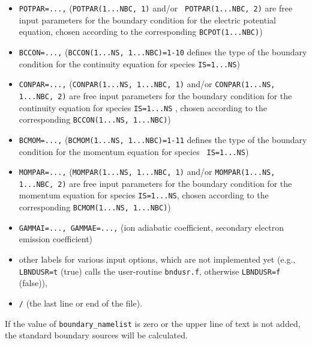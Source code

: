 \documentclass[11pt]{article}
\begin{document}
\begin{itemize}
\item  \texttt{POTPAR=...,} (\texttt{POTPAR(1...NBC, 1)} and/or \texttt{%
POTPAR(1...NBC, 2)} are free input parameters for the boundary condition for
the electric potential equation, chosen according to the corresponding 
\texttt{BCPOT(1...NBC)})

\item  \texttt{BCCON=...,} (\texttt{BCCON(1...NS, 1...NBC)=1-10} defines the
type of the boundary condition for the continuity equation for species 
\texttt{IS=1...NS})

\item  \texttt{CONPAR=...,} (\texttt{CONPAR(1...NS, 1...NBC, 1)} and/or 
\texttt{CONPAR(1...NS, 1...NBC, 2)} are free input parameters for the
boundary condition for the continuity equation for species \texttt{IS=1...NS}%
, chosen according to the corresponding \texttt{BCCON(1...NS, 1...NBC)})

\item  \texttt{BCMOM=...,} (\texttt{BCMOM(1...NS, 1...NBC)=1-11} defines the
type of the boundary condition for the momentum equation for species \texttt{%
IS=1...NS})

\item  \texttt{MOMPAR=...,} (\texttt{MOMPAR(1...NS, 1...NBC, 1)} and/or 
\texttt{MOMPAR(1...NS, 1...NBC, 2)} are free input parameters for the
boundary condition for the momentum equation for species \texttt{IS=1...NS},
chosen according to the corresponding \texttt{BCMOM(1...NS, 1...NBC)})

\item  \texttt{GAMMAI=..., GAMMAE=...,} (ion adiabatic coefficient,
secondary electron emission coefficient)

\item  other labels for various input options, which are not implemented yet
(e.g., \texttt{LBNDUSR=t} (true) calls the user-routine \texttt{bndusr.f},
otherwise \texttt{LBNDUSR=f} (false)),

\item  \texttt{/} (the last line or end of the file).
\end{itemize}

\bigskip

If the value of \texttt{boundary\_namelist} is zero or the upper line of
text is not added, the standard boundary sources will be calculated.

\bigskip
\end{document}
